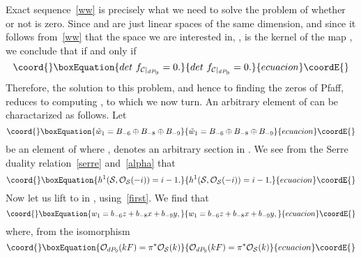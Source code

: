 \documentclass[a4paper,12pt]{article}
\numberwithin{equation}{section}
\theoremstyle{plain}
\begin{document}
Exact sequence~\eqref{ww} is precisely what we need to solve the problem
of whether or not \coordHE{} is zero.
Since \coordHE{} and \coordHE{} are just linear spaces of the same dimension, and
since
it follows from~\eqref{ww}
that the space we are interested in, \coordHE{},
is the kernel of the map \coordHE{}, we conclude that
\coordHE{} if and only if
%
\begin{equation}\coord{}\boxEquation{
det{\ }f_{{\cal{C}}|_{dP_{9}}} =0.
\label{58}
}{
det{\ }f_{{\cal{C}}|_{dP_{9}}} =0.
}{ecuacion}\coordE{}\end{equation}
%
Therefore, the solution to this problem, and hence to
finding the zeros of Pfaff\coordHE{},
reduces
to computing \coordHE{}, to which we now turn.
An arbitrary element of \coordHE{} can be charactarized as follows. Let
%
\begin{equation}\coord{}\boxEquation{
\tilde{w}_1 =  B_{-6} \oplus B_{-8} \oplus B_{-9}
\label{59}
}{
\tilde{w}_1 =  B_{-6} \oplus B_{-8} \oplus B_{-9}
}{ecuacion}\coordE{}\end{equation}
%
be an element of \coordHE{} where
\coordHE{}, \coordHE{} denotes an arbitrary section in
\coordHE{}. We see from the Serre duality
relation~\eqref{serre} and~\eqref{alpha} that
%
\begin{equation}\coord{}\boxEquation{
h^{1}({\cal S}, {\cal O}_{\cal S}(-i)) = i-1.
\label{dim}
}{
h^{1}({\cal S}, {\cal O}_{\cal S}(-i)) = i-1.
}{ecuacion}\coordE{}\end{equation}
%
Now let us lift \coordHE{} to \coordHE{} in
\coordHE{},
using~\eqref{first}.
We find that
%
\begin{equation}\coord{}\boxEquation{
w_{1} = b_{-6} z + b_{-8} x + b_{-9} y,
\label{lift}
}{
w_{1} = b_{-6} z + b_{-8} x + b_{-9} y,
}{ecuacion}\coordE{}\end{equation}
%
where, from the isomorphism
%
\begin{equation}\coord{}\boxEquation{
{\cal O}_{dP_9} (kF) = \pi^{*} {\cal O}_{{\cal S}} (k)
\label{60}
}{
{\cal O}_{dP_9} (kF) = \pi^{*} {\cal O}_{{\cal S}} (k)
}{ecuacion}\coordE{}\end{equation}
\end{document}
